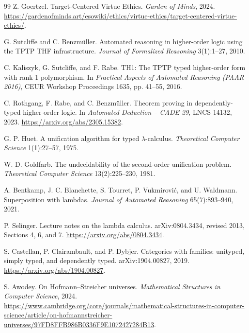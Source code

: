 \documentclass[11pt]{article}
\theoremstyle{definition}
\theoremstyle{remark}
\begin{document}
\begin{thebibliography}{99}
Z. Goertzel.
\newblock Target-Centered Virtue Ethics.
\newblock \emph{Garden of Minds}, 2024.
\newblock \url{https://gardenofminds.art/esowiki/ethics/virtue-ethics/target-centered-virtue-ethics/}.

G. Sutcliffe and C. Benzm\"uller.
\newblock Automated reasoning in higher-order logic using the TPTP THF
  infrastructure.
\newblock \emph{Journal of Formalized Reasoning} 3(1):1--27, 2010.

C. Kaliszyk, G. Sutcliffe, and F. Rabe.
\newblock TH1: The TPTP typed higher-order form with rank-1 polymorphism.
\newblock In \emph{Practical Aspects of Automated Reasoning (PAAR 2016)},
  CEUR Workshop Proceedings 1635, pp. 41--55, 2016.

C. Rothgang, F. Rabe, and C. Benzm\"uller.
\newblock Theorem proving in dependently-typed higher-order logic.
\newblock In \emph{Automated Deduction -- CADE 29}, LNCS 14132, 2023.
\newblock \url{https://arxiv.org/abs/2305.15382}.

G. P. Huet.
\newblock A unification algorithm for typed $\lambda$-calculus.
\newblock \emph{Theoretical Computer Science} 1(1):27--57, 1975.

W. D. Goldfarb.
\newblock The undecidability of the second-order unification problem.
\newblock \emph{Theoretical Computer Science} 13(2):225--230, 1981.

A. Bentkamp, J. C. Blanchette, S. Tourret, P. Vukmirovi\'c, and U. Waldmann.
\newblock Superposition with lambdas.
\newblock \emph{Journal of Automated Reasoning} 65(7):893--940, 2021.

P. Selinger.
\newblock Lecture notes on the lambda calculus.
\newblock arXiv:0804.3434, revised 2013, Sections 4, 6, and 7.
\newblock \url{https://arxiv.org/abs/0804.3434}.

S. Castellan, P. Clairambault, and P. Dybjer.
\newblock Categories with families: unityped, simply typed, and dependently typed.
\newblock arXiv:1904.00827, 2019.
\newblock \url{https://arxiv.org/abs/1904.00827}.

S. Awodey.
\newblock On Hofmann--Streicher universes.
\newblock \emph{Mathematical Structures in Computer Science}, 2024.
\newblock \url{https://www.cambridge.org/core/journals/mathematical-structures-in-computer-science/article/on-hofmannstreicher-universes/97FD8FFB986B0336F9E1072427284B13}.


\end{thebibliography}
\end{document}
